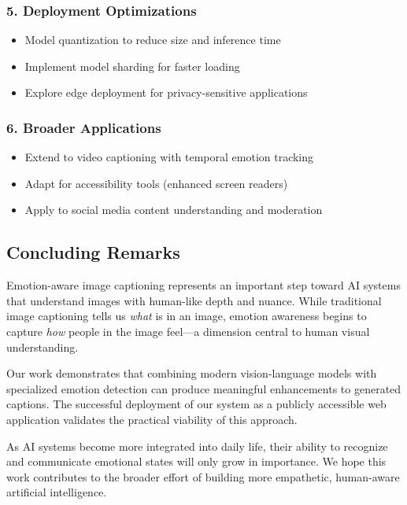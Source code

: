 \documentclass[12pt]{article}
\begin{document}
\subsubsection{5. Deployment Optimizations}
\begin{itemize}
\item Model quantization to reduce size and inference time
\item Implement model sharding for faster loading
\item Explore edge deployment for privacy-sensitive applications
\end{itemize}

\subsubsection{6. Broader Applications}
\begin{itemize}
\item Extend to video captioning with temporal emotion tracking
\item Adapt for accessibility tools (enhanced screen readers)
\item Apply to social media content understanding and moderation
\end{itemize}

\subsection{Concluding Remarks}

Emotion-aware image captioning represents an important step toward AI systems that understand images with human-like depth and nuance. While traditional image captioning tells us \textit{what} is in an image, emotion awareness begins to capture \textit{how} people in the image feel—a dimension central to human visual understanding.

Our work demonstrates that combining modern vision-language models with specialized emotion detection can produce meaningful enhancements to generated captions. The successful deployment of our system as a publicly accessible web application validates the practical viability of this approach.

As AI systems become more integrated into daily life, their ability to recognize and communicate emotional states will only grow in importance. We hope this work contributes to the broader effort of building more empathetic, human-aware artificial intelligence.

\end{document}
